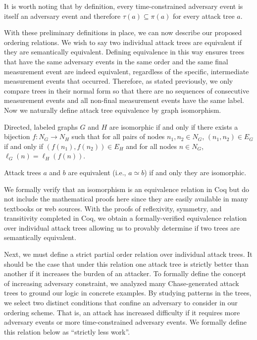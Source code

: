 \documentclass[runningheads]{llncs}
\theoremstyle{definition}
\begin{document}
\noindent It is worth noting that by definition, every time-constrained adversary event is itself an adversary event and therefore $\tau(a) \subseteq \pi(a)$ for every attack tree $a$.


With these preliminary definitions in place, we can now describe our proposed ordering relations. We wish to say two individual attack trees are equivalent if they are semantically equivalent. Defining equivalence in this way ensures trees that have the same adversary events in the same order and the same final measurement event are indeed equivalent, regardless of the specific, intermediate measurement events that occurred. Therefore, as stated previously, we only compare trees in their normal form so that there are no sequences of consecutive measurement events and all non-final measurement events have the same label. Now we naturally define attack tree equivalence by graph isomorphism.


\begin{definition}[Isomorphism]
    Directed, labeled graphs $G$ and $H$ are isomorphic if and only if there exists a bijection $f : N_G \to N_H$ such that for all pairs of nodes $n_1, n_2 \in N_G$, $(n_1,n_2) \in E_G$ if and only if $(f(n_1),f(n_2)) \in E_H$ and for all nodes $n \in N_G$, $\ell_G(n) = \ell_H(f(n))$.
\end{definition}


\begin{definition}
  Attack trees $a$ and $b$ are equivalent (i.e., $a \simeq b$) if and only they are isomorphic.
\end{definition}


\noindent We formally verify that an isomorphism is an equivalence relation in Coq but do not include the mathematical proofs here since they are easily available in many textbooks or web sources. With the proofs of reflexivity, symmetry, and transitivity completed in Coq, we obtain a formally-verified equivalence relation over individual attack trees allowing us to provably determine if two trees are semantically equivalent.


Next, we must define a strict partial order relation over individual attack trees. It should be the case that under this relation one attack tree is strictly better than another if it increases the burden of an attacker. To formally define the concept of increasing adversary constraint, we analyzed many Chase-generated attack trees to ground our logic in concrete examples. By studying patterns in the trees, we select two distinct conditions that confine an adversary to consider in our ordering scheme. That is, an attack has increased difficulty if it requires more adversary events or more time-constrained adversary events. We formally define this relation below as ``strictly less work''.
\end{document}
